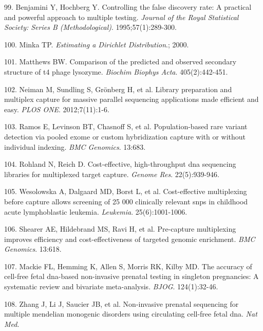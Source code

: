 \documentclass[11pt,letterpaper]{book}
\begin{document}
\leavevmode\hypertarget{ref-benjamini:1995aa}{}%
99. Benjamini Y, Hochberg Y. Controlling the false discovery rate: A practical and powerful approach to multiple testing. \emph{Journal of the Royal Statistical Society: Series B (Methodological)}. 1995;57(1):289-300.

\leavevmode\hypertarget{ref-minka:2000aa}{}%
100. Minka TP. \emph{Estimating a Dirichlet Distribution}.; 2000.

\leavevmode\hypertarget{ref-matthews:1975aa}{}%
101. Matthews BW. Comparison of the predicted and observed secondary structure of t4 phage lysozyme. \emph{Biochim Biophys Acta}. 405(2):442-451.

\leavevmode\hypertarget{ref-neiman:2012aa}{}%
102. Neiman M, Sundling S, Grönberg H, et al. Library preparation and multiplex capture for massive parallel sequencing applications made efficient and easy. \emph{PLOS ONE}. 2012;7(11):1-6.

\leavevmode\hypertarget{ref-ramos:2012aa}{}%
103. Ramos E, Levinson BT, Chasnoff S, et al. Population-based rare variant detection via pooled exome or custom hybridization capture with or without individual indexing. \emph{BMC Genomics}. 13:683.

\leavevmode\hypertarget{ref-rohland:2012aa}{}%
104. Rohland N, Reich D. Cost-effective, high-throughput dna sequencing libraries for multiplexed target capture. \emph{Genome Res}. 22(5):939-946.

\leavevmode\hypertarget{ref-wesolowska:2011aa}{}%
105. Wesolowska A, Dalgaard MD, Borst L, et al. Cost-effective multiplexing before capture allows screening of 25 000 clinically relevant snps in childhood acute lymphoblastic leukemia. \emph{Leukemia}. 25(6):1001-1006.

\leavevmode\hypertarget{ref-shearer:2012aa}{}%
106. Shearer AE, Hildebrand MS, Ravi H, et al. Pre-capture multiplexing improves efficiency and cost-effectiveness of targeted genomic enrichment. \emph{BMC Genomics}. 13:618.

\leavevmode\hypertarget{ref-mackie:2017aa}{}%
107. Mackie FL, Hemming K, Allen S, Morris RK, Kilby MD. The accuracy of cell-free fetal dna-based non-invasive prenatal testing in singleton pregnancies: A systematic review and bivariate meta-analysis. \emph{BJOG}. 124(1):32-46.

\leavevmode\hypertarget{ref-zhang:2019aa}{}%
108. Zhang J, Li J, Saucier JB, et al. Non-invasive prenatal sequencing for multiple mendelian monogenic disorders using circulating cell-free fetal dna. \emph{Nat Med}.
\end{document}
